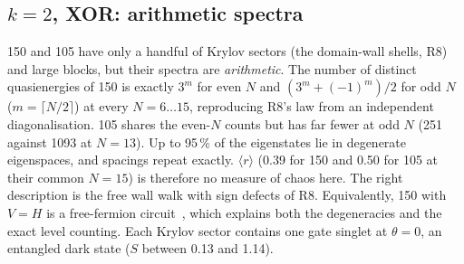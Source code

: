 \subsection{$k=2$, XOR: arithmetic spectra}
150 and 105 have only a handful of Krylov sectors (the domain-wall shells, R8) and large blocks, but their spectra are
\emph{arithmetic}. The number of distinct quasienergies of 150 is exactly $3^m$ for even $N$ and $(3^m+(-1)^m)/2$ for odd
$N$ ($m=\lceil N/2\rceil$) at every $N=6\ldots15$, reproducing R8's law from an independent diagonalisation. 105 shares
the even-$N$ counts but has far fewer at odd $N$ (251 against 1093 at $N=13$). Up to 95\,\% of the eigenstates lie in
degenerate eigenspaces, and spacings repeat exactly. $\langle r\rangle$ (0.39 for 150 and 0.50 for 105 at their common $N=15$) is therefore no measure of chaos
here. The right description is the free wall walk with sign defects of R8. Equivalently, 150 with $V=H$ is a
free-fermion circuit~\cite{hillberry2024}, which explains both the degeneracies and the exact level counting. Each Krylov sector contains one gate singlet at
$\theta=0$, an entangled dark state ($S$ between 0.13 and 1.14).


